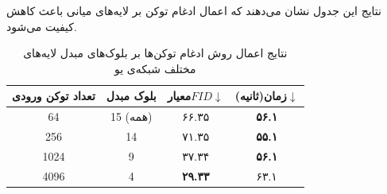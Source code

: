 \begin{table}[h!]
	\centering
	\caption{نتایج اعمال روش ادغام توکن‌ها بر بلوک‌های مبدل لا‌یه‌های مختلف شبکه‌ی یو}
	\small
	نتایج این جدول نشان‌ می‌دهند که اعمال ادغام توکن بر لایه‌های میانی باعث کاهش کیفیت می‌شود\cite{bolya2023token}.
	\begin{tabular}{|c|c|c|c|}
		\hline
		\textbf{تعداد توکن ورودی} & \textbf{بلوک مبدل} & \textbf{معیار$FID$$\downarrow$} & \textbf{زمان(ثانیه)$\downarrow$} \\ \hline
		64 & 15 (همه) & ۶۶.۳۵ & \textbf{۵۶.۱} \\ \hline
		256 & 14 & ۷۱.۳۵ & \textbf{۵۵.۱} \\ \hline
		1024 & 9 & ۳۷.۳۴ & \textbf{۵۶.۱} \\ \hline
		4096 & 4 & \textbf{۲۹.۳۳} & ۶۳.۱ \\ \hline
	\end{tabular}
	\label{tab1}
	
\end{table}


